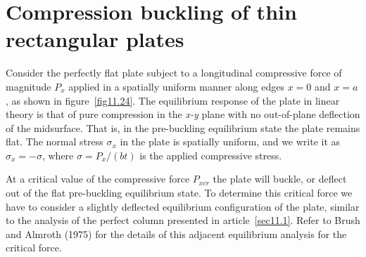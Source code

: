 \documentclass{AeroStructure-ERJohnson}
\begin{document}
\section{Compression buckling of thin rectangular plates}\label{sec11.7}

Consider the perfectly flat plate subject to a longitudinal compressive force of magnitude $P_{x}$ applied in a spatially uniform manner along edges $x=0$ and $x=a$, as shown in figure~\ref{fig11.24}. The equilibrium response of the plate in linear theory is that of pure compression in the \textit{x-y} plane with no out-of-plane deflection of the midsurface. That is, in the pre-buckling equilibrium state the plate remains flat. The normal stress $\sigma_{x}$ in the plate is spatially uniform, and we write it as $\sigma_{x}=-\sigma$, where $\sigma=P_{x}/(b t)$ is the applied compressive stress.

At a critical value of the compressive force $P_{xcr}$ the plate will buckle, or deflect out of the flat pre-buckling equilibrium state. To determine this critical force we have to consider a slightly deflected equilibrium configuration of the plate, similar to the analysis of the perfect column presented in article~\ref{sec11.1}. Refer to Brush and Almroth (1975) for the details of this adjacent equilibrium analysis for the critical force\vadjust{\vspace*{8pt}\pagebreak}.
\end{document}
